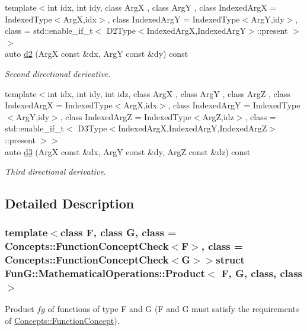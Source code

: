 \begin{DoxyCompactItemize}
{\footnotesize template$<$int idx, int idy, class Arg\-X , class Arg\-Y , class Indexed\-Arg\-X  = Indexed\-Type$<$\-Arg\-X,idx$>$, class Indexed\-Arg\-Y  = Indexed\-Type$<$\-Arg\-Y,idy$>$, class  = std\-::enable\-\_\-if\-\_\-t$<$ D2\-Type$<$\-Indexed\-Arg\-X,\-Indexed\-Arg\-Y$>$\-::present $>$$>$ }\\auto \hyperlink{structFunG_1_1MathematicalOperations_1_1Product_a91802ff95963324b5f36016ac5f8c5e0}{d2} (Arg\-X const \&dx, Arg\-Y const \&dy) const 
\begin{DoxyCompactList}\small\item\em Second directional derivative. \end{DoxyCompactList}\item 
{\footnotesize template$<$int idx, int idy, int idz, class Arg\-X , class Arg\-Y , class Arg\-Z , class Indexed\-Arg\-X  = Indexed\-Type$<$\-Arg\-X,idx$>$, class Indexed\-Arg\-Y  = Indexed\-Type$<$\-Arg\-Y,idy$>$, class Indexed\-Arg\-Z  = Indexed\-Type$<$\-Arg\-Z,idz$>$, class  = std\-::enable\-\_\-if\-\_\-t$<$ D3\-Type$<$\-Indexed\-Arg\-X,\-Indexed\-Arg\-Y,\-Indexed\-Arg\-Z$>$\-::present $>$$>$ }\\auto \hyperlink{structFunG_1_1MathematicalOperations_1_1Product_a1ba58e174ea3864a63a4158b95fc8db0}{d3} (Arg\-X const \&dx, Arg\-Y const \&dy, Arg\-Z const \&dz) const 
\begin{DoxyCompactList}\small\item\em Third directional derivative. \end{DoxyCompactList}\end{DoxyCompactItemize}


\subsection{Detailed Description}
\subsubsection*{template$<$class F, class G, class = Concepts\-::\-Function\-Concept\-Check$<$\-F$>$, class = Concepts\-::\-Function\-Concept\-Check$<$\-G$>$$>$struct Fun\-G\-::\-Mathematical\-Operations\-::\-Product$<$ F, G, class, class $>$}

Product $fg$ of functions of type F and G (F and G must satisfy the requirements of \hyperlink{structFunG_1_1Concepts_1_1FunctionConcept}{Concepts\-::\-Function\-Concept}). 

